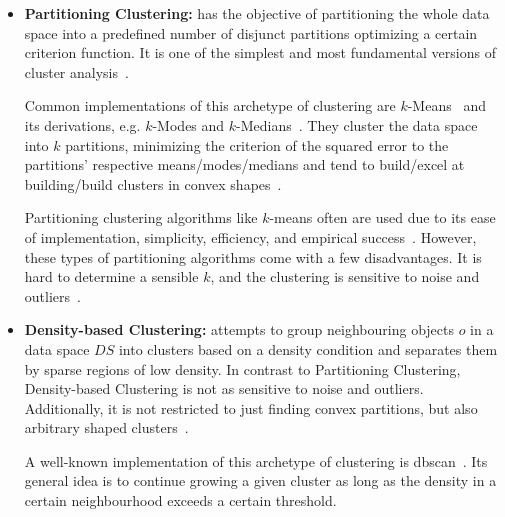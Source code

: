 \begin{itemize}
    \item \textbf{Partitioning Clustering:} has the objective of partitioning the whole data space into a predefined number of disjunct partitions optimizing a certain criterion function. It is one of the simplest and most fundamental versions of cluster analysis~\cite[Ch.10.2]{han2011data}.
    
    Common implementations of this archetype of clustering are $k$-Means~\cite{kmeansmacqueen1967some} and its derivations, e.g. $k$-Modes and $k$-Medians~\cite{kmeanshalfcenturysteinley2006k}. They cluster the data space into $k$ partitions, minimizing the criterion of the squared error to the partitions' respective means/modes/medians and tend to build/excel at building/build clusters in convex shapes~\cite{clusteringsurveyberkhin2006survey}. 
    
    Partitioning clustering algorithms like $k$-means often are used due to its ease of implementation, simplicity, efficiency, and empirical success~\cite{kmeans50jain2010data}.
    However, these types of partitioning algorithms come with a few disadvantages. It is hard to determine a sensible $k$, and the clustering is sensitive to noise and outliers~\cite{dataclusteringreviewjain1999data}. 
    
    \item \textbf{Density-based Clustering:} attempts to group neighbouring objects $o$ in a data space $DS$ into clusters based on a density condition and separates them by sparse regions of low density. In contrast to Partitioning Clustering, Density-based Clustering is not as sensitive to noise and outliers. Additionally, it is not restricted to just finding convex partitions, but also arbitrary shaped clusters~\cite[Ch.10.4]{han2011data}.
    
    A well-known implementation of this archetype of clustering is \acrshort{dbscan}~\cite{DBSCANEKSX96}. Its general idea is to continue growing a given cluster as long as the density in a certain neighbourhood exceeds a certain threshold. 
    

\end{itemize}
